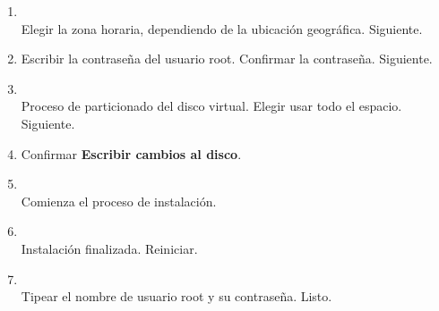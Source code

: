 \documentclass[11pt]{article}
\begin{document}
\begin{enumerate}
			\item 
				\begin{minipage}[t]{\linewidth}
			          \raggedright
			          \medskip
			          \\Elegir la zona horaria, dependiendo de la ubicación geográfica. Siguiente. 
			    \end{minipage}	
			
			\item Escribir la contraseña del usuario root. Confirmar la contraseña. Siguiente.
			\item 
				\begin{minipage}[t]{\linewidth}
			          \raggedright
			          \medskip
			          \\Proceso de particionado del disco virtual. Elegir usar todo el espacio. Siguiente. 
			    \end{minipage}	

			\item Confirmar \textbf{Escribir cambios al disco}.

			\item 
				\begin{minipage}[t]{\linewidth}
			        \raggedright
			        \medskip
			        \\Comienza el proceso de instalación. 
		        \end{minipage}	

		    \item 
		    	\begin{minipage}[t]{\linewidth}
			        \raggedright
			        \medskip
			        \\Instalación finalizada. Reiniciar. 
		        \end{minipage}	

		   	\item 
		   		\begin{minipage}[t]{\linewidth}
			        \raggedright
			        \medskip
			        \\Tipear el nombre de usuario root y su contraseña. Listo. 
		        \end{minipage}			   
		\end{enumerate}
\end{document}
